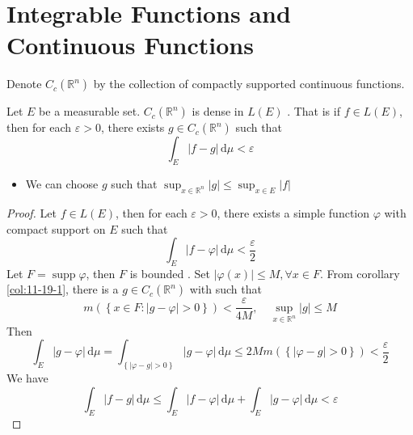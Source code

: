 \documentclass[../main.tex]{subfiles}
\begin{document}
\section{Integrable Functions and Continuous Functions}

\begin{definition}{}{}
    Denote \(  C_{c}\left( \mathbb{R} ^{n} \right)   \) by the collection of compactly supported continuous functions.
\end{definition}


\begin{theorem}{}{}
    Let \(  E  \) be a measurable set.  \(  C_{c}\left( \mathbb{R}^{n} \right)   \) is dense in \(  L\left( E \right)   \)  . That is if \(  f\in L\left( E \right)   \), then for each \(   \varepsilon > 0  \), there exists \(  g\in C_{c}\left( \mathbb{R}^{n} \right)   \) such that \[
    \int_{E}\left| f-g \right|\,\mathrm{d} \mu <  \varepsilon  
    \]   
\end{theorem}

\begin{remark}
    \begin{itemize}
        \item We can choose \(  g  \) such that \( \sup _{x\in \mathbb{R}^{n}} \left|  g\right|\le \sup _{ x \in E}\left| f \right|    \)  
    \end{itemize}
    
\end{remark}

\begin{proof}
    Let \(  f \in L\left( E \right)   \), then for each \(   \varepsilon > 0  \),   there exists a simple function \(   \varphi   \) with compact support on \(  E  \)  such that    \[
    \int_{E}\left| f- \varphi  \right|\,\mathrm{d} \mu < \frac{ \varepsilon  }{2}  
    \] Let \(  F= \operatorname{supp} \varphi   \), then \(  F  \) is bounded . Set \(  \left|  \varphi \left( x \right) \right| \le M,\forall x\in F   \).   From corollary \ref{col:11-19-1}, there is a \(  g\in C_{c}\left( \mathbb{R}^{n} \right)   \) with such that \[
    m\left( \left\{ x \in F: \left| g- \varphi  \right|> 0   \right\} \right)<  \frac{ \varepsilon  }{4M } ,\quad \sup _{x\in \mathbb{R}^{n}}\left| g \right|\le M 
    \]  Then  \[
    \int_{E}\left| g- \varphi  \right|\,\mathrm{d}\mu  = \int_{ \left\{ \left|  \varphi -g \right|  > 0\right\} }\left| g- \varphi  \right|\,\mathrm{d} \mu \le   2M m\left( \left\{ \left|  \varphi -g \right|  > 0\right\} \right) < \frac{ \varepsilon  }{2 } 
    \] We have \[
    \int_{E}\left| f-g \right|\,\mathrm{d} \mu \le \int_{E}\left| f- \varphi  \right|\,\mathrm{d} \mu + \int_{E}\left| g- \varphi  \right|\,\mathrm{d} \mu <  \varepsilon    
    \]
\end{proof}
\end{document}
